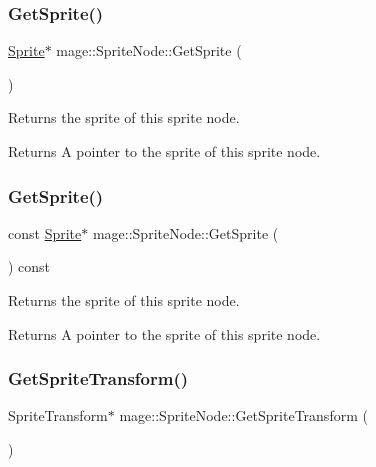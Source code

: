 \subsubsection{\texorpdfstring{Get\+Sprite()}{GetSprite()}\hspace{0.1cm}{\footnotesize\ttfamily [1/2]}}
{\footnotesize\ttfamily \hyperlink{classmage_1_1_sprite}{Sprite}$\ast$ mage\+::\+Sprite\+Node\+::\+Get\+Sprite (\begin{DoxyParamCaption}{ }\end{DoxyParamCaption})\hspace{0.3cm}{\ttfamily [noexcept]}}

Returns the sprite of this sprite node.

\begin{DoxyReturn}{Returns}
A pointer to the sprite of this sprite node. 
\end{DoxyReturn}
\hypertarget{classmage_1_1_sprite_node_a585276a679d83576464014eeb156cf10}{}\label{classmage_1_1_sprite_node_a585276a679d83576464014eeb156cf10} 
\subsubsection{\texorpdfstring{Get\+Sprite()}{GetSprite()}\hspace{0.1cm}{\footnotesize\ttfamily [2/2]}}
{\footnotesize\ttfamily const \hyperlink{classmage_1_1_sprite}{Sprite}$\ast$ mage\+::\+Sprite\+Node\+::\+Get\+Sprite (\begin{DoxyParamCaption}{ }\end{DoxyParamCaption}) const\hspace{0.3cm}{\ttfamily [noexcept]}}

Returns the sprite of this sprite node.

\begin{DoxyReturn}{Returns}
A pointer to the sprite of this sprite node. 
\end{DoxyReturn}
\hypertarget{classmage_1_1_sprite_node_a99d90a2a337a45c0623022756c53f214}{}\label{classmage_1_1_sprite_node_a99d90a2a337a45c0623022756c53f214} 
\subsubsection{\texorpdfstring{Get\+Sprite\+Transform()}{GetSpriteTransform()}\hspace{0.1cm}{\footnotesize\ttfamily [1/2]}}
{\footnotesize\ttfamily Sprite\+Transform$\ast$ mage\+::\+Sprite\+Node\+::\+Get\+Sprite\+Transform (\begin{DoxyParamCaption}{ }\end{DoxyParamCaption})\hspace{0.3cm}{\ttfamily [noexcept]}}

